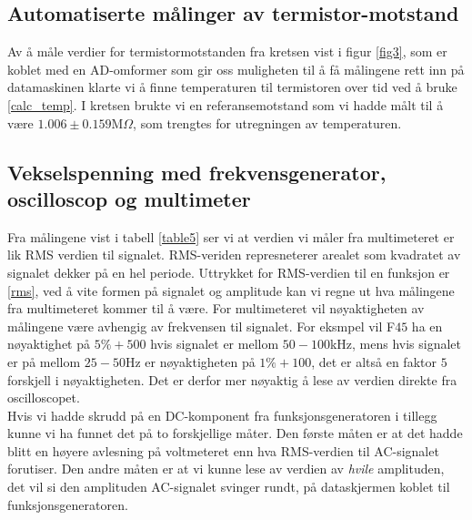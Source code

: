 \documentclass[%
 reprint,
nofootinbib,
aps,
]{revtex4-1}
\begin{document}
\subsection{Automatiserte målinger av termistor-motstand}
Av å måle verdier for termistormotstanden fra kretsen vist i figur \vref{fig3}, som er koblet med en AD-omformer som gir oss muligheten til å få målingene rett inn på datamaskinen klarte vi å finne temperaturen til termistoren over tid ved å bruke \eqref{calc_temp}. I kretsen brukte vi en referansemotstand som vi hadde målt til å være $1.006 \pm 0.159$M$\Omega$, som trengtes for utregningen av temperaturen.
\subsection{Vekselspenning med frekvensgenerator, oscilloscop og multimeter}
Fra målingene vist i tabell \ref{table5} ser vi at verdien vi måler fra multimeteret er lik RMS verdien til signalet. RMS-veriden represneterer arealet som kvadratet av signalet dekker på en hel periode. Uttrykket for RMS-verdien til en funksjon er \eqref{rms}, ved å vite formen på signalet og amplitude kan vi regne ut hva målingene fra multimeteret kommer til å være. For multimeteret vil nøyaktigheten av målingene være avhengig av frekvensen til signalet. For eksmpel vil F$45$ ha en nøyaktighet på $5\% + 500$ hvis signalet er mellom $50-100$kHz, mens hvis signalet er på mellom $25-50$Hz er nøyaktigheten på $1\%+100$, det er altså en faktor $5$ forskjell i nøyaktigheten. Det er derfor mer nøyaktig å lese av verdien direkte fra oscilloscopet. \\
Hvis vi hadde skrudd på en DC-komponent fra funksjonsgeneratoren i tillegg kunne vi ha funnet det på to forskjellige måter. Den første måten er at det hadde blitt en høyere avlesning på voltmeteret enn hva RMS-verdien til AC-signalet forutiser. Den andre måten er at vi kunne lese av verdien av \textit{hvile} amplituden, det vil si den amplituden AC-signalet svinger rundt, på dataskjermen koblet til funksjonsgeneratoren.
\end{document}
